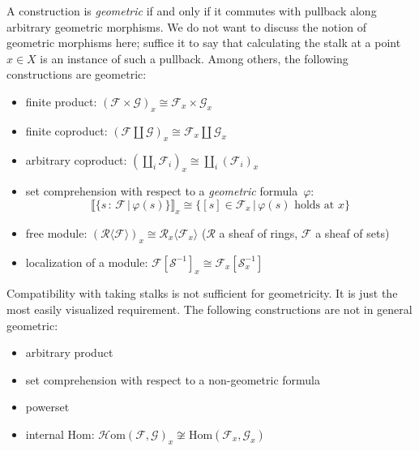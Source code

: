\documentclass[10pt,reqno,a4paper]{amsbook}
\theoremstyle{definition}
\theoremstyle{plain}
\theoremstyle{remark}
\newcommand{\F}{\mathcal{F}}
\newcommand{\G}{\mathcal{G}}
\newcommand{\R}{\mathcal{R}}
\renewcommand{\S}{\mathcal{S}}
\newcommand{\Hom}{\mathrm{Hom}}
\newcommand{\HOM}{\mathcal{H}\mathrm{om}}
\newcommand{\?}{\,{:}\,}
\renewcommand{\_}{\mathpunct{.}\,}
\newcommand{\brak}[1]{{\llbracket{#1}\rrbracket}}
\begin{document}
A construction is \emph{geometric}\label{page:geometric-constructions} if and only if it commutes with pullback
along arbitrary geometric morphisms. We do not want to discuss the notion of
geometric morphisms here; suffice it to say that calculating the stalk at a
point~$x \in X$ is an instance of such a pullback. Among others, the following
constructions are geometric:
\begin{itemize}
\item finite product: $(\F \times \G)_x \cong \F_x \times \G_x$
\item finite coproduct: $(\F \amalg \G)_x \cong \F_x \amalg \G_x$
\item arbitrary coproduct: $(\coprod_i \F_i)_x \cong \coprod_i (\F_i)_x$
\item set comprehension with respect to a \emph{geometric} formula~$\varphi$:
\[ \brak{\{ s\?\F \,|\, \varphi(s) \}}_x \cong \{ [s]\in\F_x \,|\,
\text{$\varphi(s)$ holds at $x$} \} \]
\item free module: $(\R\langle \F \rangle)_x \cong \R_x\langle \F_x
\rangle$ ($\R$ a sheaf of rings, $\F$ a sheaf of sets)
\item localization of a module: $\F[\S^{-1}]_x \cong \F_x[\S_x^{-1}]$
\end{itemize}
Compatibility with taking stalks is not sufficient for geometricity.
It is just the most easily visualized requirement.
The following constructions are not in general geometric:
\begin{itemize}
\item arbitrary product
\item set comprehension with respect to a non-geometric formula
\item powerset
\item internal Hom: $\HOM(\F,\G)_x \not\cong \Hom(\F_x,\G_x)$
\end{itemize}
\end{document}
